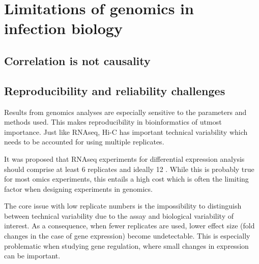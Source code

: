 
\chapter{Limitations of genomics in infection biology} %

\label{ch:03-01} %



\section{Correlation is not causality}


\section{Reproducibility and reliability challenges}
Results from genomics analyses are especially sensitive to the parameters and methods used. This makes reproducibility in bioinformatics of utmost importance. Just like RNAseq, Hi-C has important technical variability which needs to be accounted for using multiple replicates.

It was proposed that RNAseq experiments for differential expression analysis should comprise at least 6 replicates and ideally 12 \cite{schurchHowManyBiological2016}. While this is probably true for most omics experiments, this entails a high cost which is often the limiting factor when designing experiments in genomics.

The core issue with low replicate numbers is the impossibility to distinguish between technical variability due to the assay and biological variability of interest. As a consequence, when fewer replicates are used, lower effect size (fold changes in the case of gene expression) become undetectable. This is especially problematic when studying gene regulation, where small changes in expression can be important.


